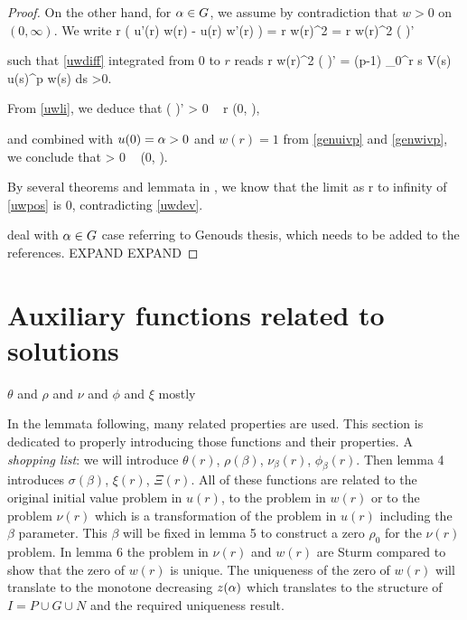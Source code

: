 \begin{proof}
On the other hand, for $\alpha \in G$, we assume by contradiction that $w > 0$
on $(0, \infty)$. 
We write
\be
    r \left( u'(r) w(r) - u(r) w'(r) \right)
    = r w(r)^2 
    = r w(r)^2 \left(  \right)'
\ee

such that \cref{uwdiff} integrated from $0$ to $r$ reads
\be \label{uwli}
r w(r)^2 \left(  \right)' = (p-1) \int_0^r s V(s) u(s)^p w(s) ds >0.
\ee

From \eqref{uwli}, we deduce that 
\be \label{uwdev}
    \left(  \right)' > 0 \quad {}~ r \in (0, \infty),
\ee

and combined with $u(0) = \alpha > 0$ and $w(r) = 1$ from \eqref{genuivp} and
\eqref{genwivp}, we conclude that
\be \label{uwpos}
     > 0 \quad {}~ (0, \infty).
\ee

{\red By several theorems and lemmata in \cite{genthes}, we know that the limit
as r to infinity of \eqref{uwpos} is 0, contradicting \eqref{uwdev}.}

{\red deal with $\alpha \in G$ case referring to Genouds thesis, which needs to be
added to the references. EXPAND EXPAND} 
\end{proof}

\section{Auxiliary functions related to solutions}
$\theta$ and $\rho$ and $\nu$ and $\phi$ and $\xi$ mostly

In the lemmata following, many related properties are used. This section is
dedicated to properly introducing those functions and their properties. A
\emph{shopping list}: we will introduce $\theta(r)$, $\rho(\beta)$,
$\nu_\beta(r)$, $\phi_\beta(r)$. Then lemma 4 introduces $\sigma(\beta)$,
$\xi(r)$, $\Xi(r)$. All of these functions are related to the original initial
value problem in $u(r)$, to the problem in $w(r)$ or to the problem $\nu(r)$
which is a transformation of the problem in $u(r)$ including the $\beta$
parameter. This $\beta$ will be fixed in lemma 5 to construct a zero $\rho_0$
for the $\nu(r)$ problem. In lemma 6 the problem in $\nu(r)$ and $w(r)$ are
Sturm compared to show that the zero of $w(r)$ is unique. The uniqueness of the
zero of $w(r)$ will translate to the monotone decreasing $z(\alpha)$ which translates
to the structure of $I=P\cup G\cup N$ and the required uniqueness result.

